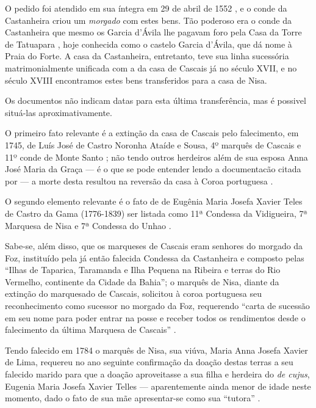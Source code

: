 O pedido foi atendido em sua íntegra em 29 de abril de 1552 \cite[p.~III-3 - III-4]{teixeira_doacoes_1978}, e o conde da Castanheira criou um \textit{morgado} com estes bens. Tão poderoso era o conde da Castanheira que mesmo os Garcia d'Ávila lhe pagavam foro pela Casa da Torre de Tatuapara \cite[p.~III-5]{teixeira_doacoes_1978}, hoje conhecida como o castelo Garcia d'Ávila, que dá nome à Praia do Forte. A casa da Castanheira, entretanto, teve sua linha sucessória matrimonialmente unificada com a da casa de Cascais já no século XVII, e no século XVIII encontramos estes bens transferidos para a casa de Nisa.

Os documentos não indicam datas para esta última transferência, mas é possivel situá-las aproximativamente. 

O primeiro fato relevante é a extinção da casa de Cascais pelo falecimento, em 1745, de Luís José de Castro Noronha Ataíde e Sousa, 4º marquês de Cascais e 11º conde de Monte Santo \cite{wiki_cascais_2015}; não tendo outros herdeiros além de sua esposa Anna José Maria da Graça --- é o que se pode entender lendo a documentacão citada por  --- a morte desta resultou na reversão da casa à Coroa portuguesa \cite{wiki_cascais_2015}. 

O segundo elemento relevante é o fato de de Eugênia Maria Josefa Xavier Teles de Castro da Gama (1776-1839) ser listada como 11ª Condessa da Vidigueira, 7ª Marquesa de Nisa e 7ª Condessa do Unhao \cite{wiki_nisa_2015}. 

Sabe-se, além disso, que os marqueses de Cascais eram senhores do morgado da Foz, instituído pela já então falecida Condessa da Castanheira e composto pelas ``Ilhas de Taparica, Taramanda e Ilha Pequena na Ribeira e terras do Rio Vermelho, continente da Cidade da Bahia''; o marquês de Nisa, diante da extinção do marquesado de Cascais, solicitou à coroa portuguesa seu reconhecimento como sucessor no morgado da Foz, requerendo ``carta de sucessão em seu nome para poder entrar na posse e receber todos os rendimentos desde o falecimento da última Marquesa de Cascais'' \cite[p.~592]{castralmeida_ultramar_1910}. 

Tendo falecido em 1784 o marquês de Nisa, sua viúva, Maria Anna Josefa Xavier de Lima, requereu no ano seguinte confirmação da doação destas terras a seu falecido marido para que a doação aproveitasse a sua filha e herdeira do \textit{de cujus}, Eugenia Maria Josefa Xavier Telles --- aparentemente ainda menor de idade neste momento, dado o fato de sua mãe apresentar-se como sua ``tutora'' \cite[p.~592]{castralmeida_ultramar_1910}. 

